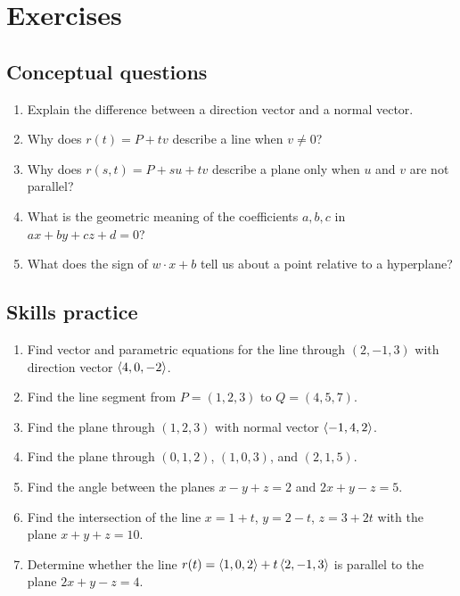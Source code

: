 \section{Exercises}

\subsection*{Conceptual questions}
\begin{enumerate}
\item Explain the difference between a direction vector and a normal vector.
\item Why does $r(t)=P+tv$ describe a line when $v\ne 0$?
\item Why does $r(s,t)=P+su+tv$ describe a plane only when $u$ and $v$ are not parallel?
\item What is the geometric meaning of the coefficients $a,b,c$ in $ax+by+cz+d=0$?
\item What does the sign of $w\cdot x+b$ tell us about a point relative to a hyperplane?
\end{enumerate}

\subsection*{Skills practice}
\begin{enumerate}[resume]
\item Find vector and parametric equations for the line through $(2,-1,3)$ with direction vector $\left\langle 4,0,-2\right\rangle$.
\item Find the line segment from $P=(1,2,3)$ to $Q=(4,5,7)$.
\item Find the plane through $(1,2,3)$ with normal vector $\left\langle -1,4,2\right\rangle$.
\item Find the plane through $(0,1,2)$, $(1,0,3)$, and $(2,1,5)$.
\item Find the angle between the planes $x-y+z=2$ and $2x+y-z=5$.
\item Find the intersection of the line $x=1+t$, $y=2-t$, $z=3+2t$ with the plane $x+y+z=10$.
\item Determine whether the line $r(t)=\left\langle 1,0,2\right\rangle+t\left\langle 2,-1,3\right\rangle$ is parallel to the plane $2x+y-z=4$.
\end{enumerate}

